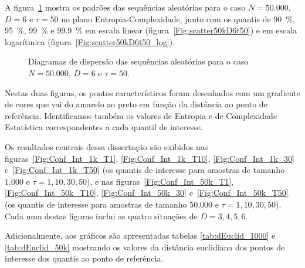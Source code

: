 A figura~\ref{Fig:QuantD3tau10log} mostra os padrões das sequências aleatórias para o caso $N=50.000$, $D=6$ e $\tau=50$ no plano Entropia-Complexidade, junto com os quantis de \SI{90}{\percent}, \SI{95}{\percent}, \SI{99}{\percent} e \SI{99,9}{\percent} em escala linear (figura~\ref{Fig:scatter50kD6t50}) e em escala logarítmica (figura~\ref{Fig:scatter50kD6t50_log}).

\begin{figure}
\centering
{}
\caption{Diagramas de dispersão das sequências aleatórias para o caso $N=50.000$, $D=6$ e $\tau=50$.}\label{Fig:QuantD3tau10log}
\end{figure}

Nestas duas figuras, os pontos característicos foram desenhados com um gradiente de cores que vai do amarelo ao preto em função da distância ao ponto de referência.
Identificamos também os valores de Entropia e de Complexidade Estatística correspondentes a cada quantil de interesse.

Os resultados centrais dessa dissertação são exibidos nas figuras~\ref{Fig:Conf_Int_1k_T1}, \ref{Fig:Conf_Int_1k_T10}, 
\ref{Fig:Conf_Int_1k_30} e~\ref{Fig:Conf_Int_1k_T50} (os quantis de interesse para amostras de tamanho $1.000$ e $\tau=1, 10, 30, 50$), e nas figuras~\ref{Fig:Conf_Int_50k_T1}, \ref{Fig:Conf_Int_50k_T10},
\ref{Fig:Conf_Int_50k_30} e~\ref{Fig:Conf_Int_50k_T50} (os quantis de interesse para amostras de tamanho $50.000$ e $\tau=1, 10, 30, 50$).
Cada uma destas figuras inclui as quatro situações de $D=3, 4, 5, 6$.

Adicionalmente, aos gráficos são apresentadas tabelas \ref{tab:dEuclid_1000} e \ref{tab:dEuclid_50k} mostrando os valores da distância euclidiana dos pontos de interesse dos quantis ao ponto de referência.


